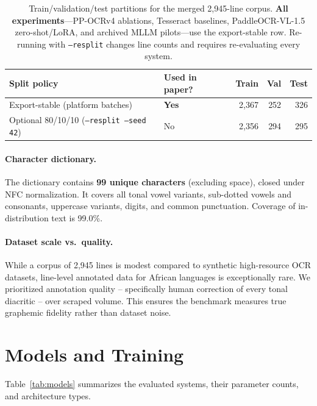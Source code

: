 \documentclass{article}
\begin{document}
\begin{table}[t]
  \centering
  \small
  \begin{tabular}{llrrr}
    \toprule
    Split policy & Used in paper? & Train & Val & Test \\
    \midrule
    Export-stable (platform batches) & \textbf{Yes} & 2{,}367 & 252 & 326 \\
    Optional 80/10/10 (\texttt{--resplit --seed 42}) & No & 2{,}356 & 294 & 295 \\
    \bottomrule
  \end{tabular}
  \caption{Train/validation/test partitions for the merged 2{,}945-line corpus.
  \textbf{All experiments}---PP-OCRv4 ablations, Tesseract baselines,
  PaddleOCR-VL-1.5 zero-shot/LoRA, and archived MLLM pilots---use the
  export-stable row. Re-running with \texttt{--resplit} changes line counts and
  requires re-evaluating every system.}
  \label{tab:split}
\end{table}

\paragraph{Character dictionary.}
The dictionary contains \textbf{99 unique characters} (excluding space), closed under NFC normalization. It covers all tonal vowel variants, sub-dotted vowels and consonants, uppercase variants, digits, and common punctuation. Coverage of in-distribution text is 99.0\%.

\paragraph{Dataset scale vs.\ quality.}
While a corpus of 2{,}945 lines is modest compared to synthetic high-resource OCR datasets, line-level annotated data for African languages is exceptionally rare. We prioritized annotation quality -- specifically human correction of every tonal diacritic -- over scraped volume. This ensures the benchmark measures true graphemic fidelity rather than dataset noise.

\section{Models and Training}

Table~\ref{tab:models} summarizes the evaluated systems, their parameter counts, and architecture types.
\end{document}
